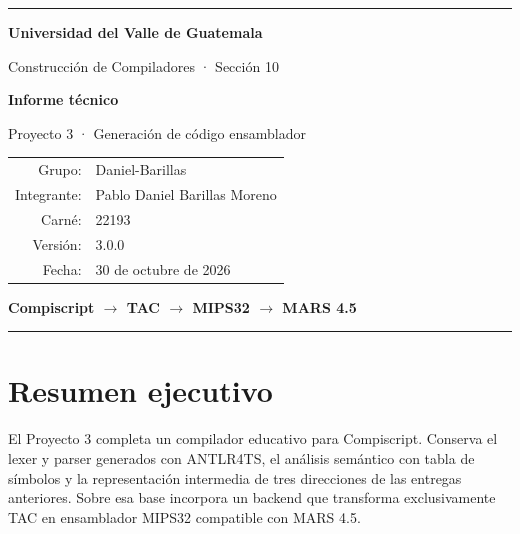 \documentclass[11pt,letterpaper,oneside]{report}
\begin{document}

\begin{titlepage}
  \pagecolor{gris}\color{tinta}
  \centering
  \vspace*{1.1cm}
  {\color{violeta}\rule{\textwidth}{7pt}\par}
  \vspace{0.8cm}
  {\Large\bfseries Universidad del Valle de Guatemala\par}
  \vspace{0.25cm}
  {\large\color{muted} Construcci\'on de Compiladores · Secci\'on 10\par}
  \vspace{1.7cm}
  \vspace{1.2cm}

  {\Huge\sffamily\bfseries Informe t\'ecnico\par}
  \vspace{0.35cm}
  {\LARGE\color{muted} Proyecto 3 · Generaci\'on de c\'odigo ensamblador\par}
  \vfill
  \begin{tabular}{rl}
    Grupo: & Daniel-Barillas\\
    Integrante: & Pablo Daniel Barillas Moreno\\
    Carn\'e: & 22193\\
    Versi\'on: & 3.0.0\\
    Fecha: & 30 de octubre de 2026
  \end{tabular}
  \vfill
  {\color{violetaoscuro}\large\bfseries Compiscript $\rightarrow$ TAC $\rightarrow$ MIPS32 $\rightarrow$ MARS 4.5\par}
  \vspace{0.55cm}
  {\color{violeta}\rule{\textwidth}{3pt}\par}
\end{titlepage}
\nopagecolor

\tableofcontents
\clearpage
{}

\chapter{Resumen ejecutivo}

El Proyecto 3 completa un compilador educativo para Compiscript. Conserva el lexer y parser generados con ANTLR4TS, el an\'alisis sem\'antico con tabla de s\'imbolos y la representaci\'on intermedia de tres direcciones de las entregas anteriores. Sobre esa base incorpora un backend que transforma exclusivamente TAC en ensamblador MIPS32 compatible con MARS 4.5.
\end{document}

